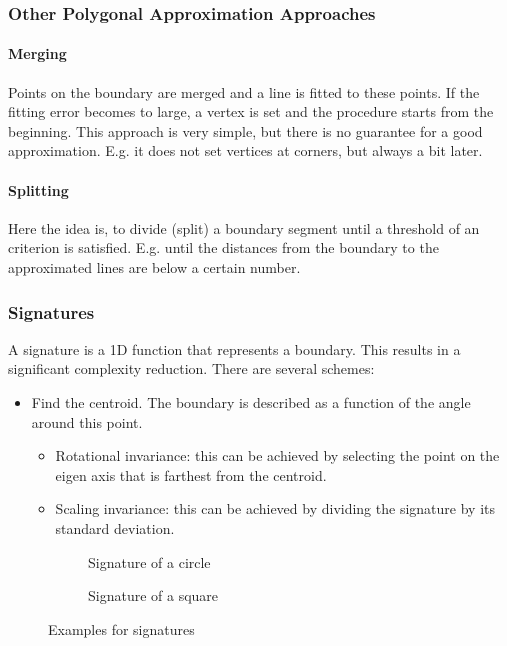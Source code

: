 \subsubsection{Other Polygonal Approximation Approaches}
\paragraph{Merging} %
Points on the boundary are merged and a line is fitted to these points.
If the fitting error becomes to large, a vertex is set and the procedure starts from the beginning.
This approach is very simple, but there is no guarantee for a good approximation.
E.g. it does not set vertices at corners, but always a bit later.

\paragraph{Splitting} %
Here the idea is, to divide (split) a boundary segment until a threshold of an criterion is satisfied.
E.g. until the distances from the boundary to the approximated lines are below a certain number.

\subsubsection{Signatures}
A signature is a 1D function that represents a boundary. This results in a significant complexity reduction. There are several schemes:\\
\begin{itemize}
\item Find the centroid. The boundary is described as a function of the angle around this point.
\begin{itemize}
\item Rotational invariance: this can be achieved by selecting the point on the eigen axis that is farthest from the centroid.
\item Scaling invariance: this can be achieved by dividing the signature by its standard deviation.
\end{itemize}
\end{itemize}
\begin{figure}[h]
	\begin{subfigure}{0.5\textwidth}
		\centering
		
		\caption{Signature of a circle}
	\end{subfigure}
	\begin{subfigure}{0.5\textwidth}
		\centering
		
		\caption{Signature of a square}
	\end{subfigure}
	\caption{Examples for signatures}
\end{figure}


